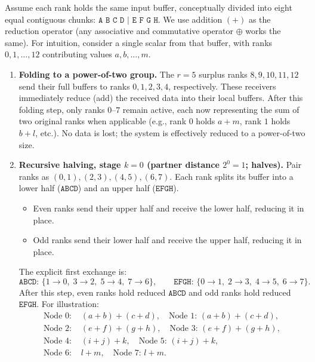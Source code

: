 \documentclass[12pt]{book}
\begin{document}
\medskip
Assume each rank holds the same input buffer, conceptually divided into eight equal contiguous chunks:
\(\texttt{A B C D | E F G H}\).
We use addition \((+)\) as the reduction operator (any associative and commutative operator \(\oplus\) works the same).
For intuition, consider a single scalar from that buffer, with ranks \(0,1,\ldots,12\) contributing values \(a,b,\ldots,m\).

\begin{enumerate}
  \item \textbf{Folding to a power-of-two group.}
  The \(r=5\) surplus ranks \(8,9,10,11,12\) send their full buffers to ranks \(0,1,2,3,4\), respectively.
  These receivers immediately reduce (add) the received data into their local buffers.
  After this folding step, only ranks \(0\)–\(7\) remain active, each now representing the sum of two original ranks when applicable
  (e.g., rank \(0\) holds \(a+m\), rank \(1\) holds \(b+l\), etc.).
  No data is lost; the system is effectively reduced to a power-of-two size.

  \item \textbf{Recursive halving, stage \(k=0\) (partner distance \(2^0=1\); halves).}
  Pair ranks as \((0,1), (2,3), (4,5), (6,7)\).
  Each rank splits its buffer into a lower half (\(\texttt{ABCD}\)) and an upper half (\(\texttt{EFGH}\)).
  \begin{itemize}
    \item Even ranks send their upper half and receive the lower half, reducing it in place.
    \item Odd ranks send their lower half and receive the upper half, reducing it in place.
  \end{itemize}
  The explicit first exchange is:
  \[
    \texttt{ABCD: }\{1\!\to\!0,\;3\!\to\!2,\;5\!\to\!4,\;7\!\to\!6\}, \qquad
    \texttt{EFGH: }\{0\!\to\!1,\;2\!\to\!3,\;4\!\to\!5,\;6\!\to\!7\}.
  \]
  After this step, even ranks hold reduced \(\texttt{ABCD}\) and odd ranks hold reduced \(\texttt{EFGH}\).
  For illustration:
  \[
  \begin{aligned}
  \text{Node 0: } & (a+b)+(c+d), \quad
  \text{Node 1: } (a+b)+(c+d), \\
  \text{Node 2: } & (e+f)+(g+h), \quad
  \text{Node 3: } (e+f)+(g+h), \\
  \text{Node 4: } & (i+j)+k, \quad
  \text{Node 5: } (i+j)+k, \\
  \text{Node 6: } & l+m, \quad
  \text{Node 7: } l+m.
  \end{aligned}
  \]


\end{enumerate}
\end{document}
